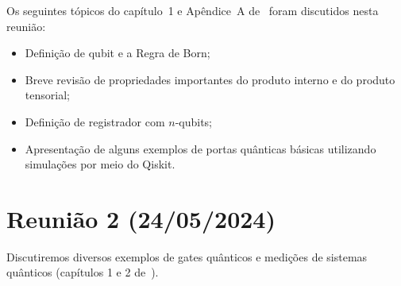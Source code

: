 \documentclass{article}
\begin{document}
Os seguintes tópicos do capítulo~1 e Apêndice~A de~\cite{deWolfLectureNotes} foram discutidos nesta reunião:
\begin{itemize}
    \item Definição de qubit e a Regra de Born;
    \item Breve revisão de propriedades importantes do produto interno e do produto tensorial;
    \item Definição de registrador com $n$-qubits;
    \item Apresentação de alguns exemplos de portas quânticas básicas utilizando simulações por meio do Qiskit.
\end{itemize}

\section*{Reunião 2 (24/05/2024)}

Discutiremos diversos exemplos de gates quânticos e medições de sistemas quânticos (capítulos 1 e 2 de~\cite{deWolfLectureNotes}).



\end{document}
